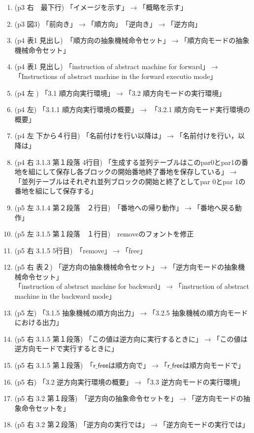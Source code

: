 \documentclass[a4j]{jarticle}
\begin{document}
\begin{enumerate}
\item (p3 右　最下行) 「イメージを示す」$\rightarrow$「概略を示す」
\item (p3 図3) 「前向き」$\rightarrow$「順方向」　「逆向き」$\rightarrow$「逆方向」
\item (p4 表1 見出し)　「順方向の抽象機械命令セット」$\rightarrow$「順方向モードの抽象機械命令セット」 
\item (p4 表1 見出し) 「instruction of abstract machine for forward」$\rightarrow$「Instructions of abstract machine in the forward executio mode」
\item (p4 左 ) 「3.1 順方向実行環境」$\rightarrow$「3.2 順方向モードの実行環境」
\item (p4 左)  「3.1.1 順方向実行環境の概要」$\rightarrow$ 「3.2.1 順方向モード実行環境の概要」
\item (p4 左 下から４行目) 「名前付けを行い以降は」$\rightarrow$「名前付けを行い，以降は」
\item (p4 右 3.1.3 第１段落 4行目) 「生成する並列テーブルはこのpar0とpar1の番地を組にして保存し各ブロックの開始番地終了番地を保存している」$\rightarrow$「並列テーブルはそれぞれ並列ブロックの開始と終了としてpar 0とpar 1の番地を組にして保存する」
\item (p5 左 3.1.4 第２段落　２行目)　「番地への帰り動作」$\rightarrow$「番地へ戻る動作」
\item (p5 左 3.1.5 第１段落　１行目)　removeのフォントを修正
\item (p5 右 3.1.5 5行目)　「remove」$\rightarrow$「free」
\item (p5 右 表２) 「逆方向の抽象機械命令セット」$\rightarrow$「逆方向モードの抽象機械命令セット」\\
「instruction of abstract machine for backward」$\rightarrow$「instruction of abstract machine in the backward mode」
\item (p5 左) 「3.1.5 抽象機械の順方向出力」$\rightarrow$「3.2.5 抽象機械の順方向モードにおける出力」
\item (p5 右 3.1.5  第１段落) 「この値は逆方向に実行するときに」$\rightarrow$「この値は逆方向モードで実行するときに」
\item (p5 右 3.1.5 第１段落)　「$\mathsf{r\_free}$は順方向で」$\rightarrow$「$\mathsf{r\_free}$は順方向モードで」
\item (p5 右) 「3.2 逆方向実行環境の概要」$\rightarrow$「3.3 逆方向モードの実行環境」
\item (p5 右 3.2 第１段落)　「逆方向の抽象命令セットを」$\rightarrow$「逆方向モードの抽象命令セットを」 
\item (p5 右 3.2 第２段落)   「逆方向の実行では」$\rightarrow$「逆方向モードの実行では」

\end{enumerate}
\end{document}
